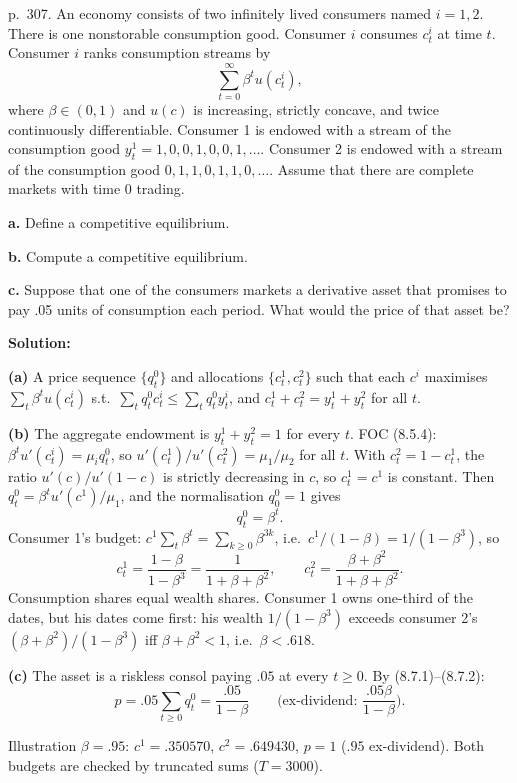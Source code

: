 \documentclass[12pt, letterpaper]{article}
\begin{document}
\begin{tcolorbox}[oddbox,title={Exercise 8.5 \quad Periodic endowments}]
\begin{tcolorbox}[questionbox]
p.~307. An economy consists of two infinitely lived consumers named $i=1,2$. There is one nonstorable
consumption good. Consumer $i$ consumes $c^i_t$ at time $t$. Consumer $i$ ranks consumption streams by
\[
\sum_{t=0}^\infty\beta^tu(c^i_t),
\]
where $\beta\in(0,1)$ and $u(c)$ is increasing, strictly concave, and twice continuously differentiable.
Consumer 1 is endowed with a stream of the consumption good $y^1_t=1,0,0,1,0,0,1,\dots$. Consumer 2 is
endowed with a stream of the consumption good $0,1,1,0,1,1,0,\dots$. Assume that there are complete
markets with time 0 trading.

\textbf{a.} Define a competitive equilibrium.

\textbf{b.} Compute a competitive equilibrium.

\textbf{c.} Suppose that one of the consumers markets a derivative asset that promises to pay .05 units of
consumption each period. What would the price of that asset be?
\end{tcolorbox}

\textbf{Solution:}

\textbf{(a)} A price sequence $\{q^0_t\}$ and allocations $\{c^1_t,c^2_t\}$ such that each $c^i$ maximises
$\sum_t\beta^tu(c^i_t)$ s.t.\ $\sum_tq^0_tc^i_t\le\sum_tq^0_ty^i_t$, and $c^1_t+c^2_t=y^1_t+y^2_t$ for all $t$.

\textbf{(b)} The aggregate endowment is $y^1_t+y^2_t=1$ for every $t$. FOC (8.5.4): $\beta^tu'(c^i_t)=\mu_iq^0_t$, so
$u'(c^1_t)/u'(c^2_t)=\mu_1/\mu_2$ for all $t$. With $c^2_t=1-c^1_t$, the ratio $u'(c)/u'(1-c)$ is strictly
decreasing in $c$, so $c^1_t=c^1$ is constant. Then $q^0_t=\beta^tu'(c^1)/\mu_1$, and the normalisation
$q^0_0=1$ gives
\[
q^0_t=\beta^t.
\]
Consumer 1's budget: $c^1\sum_t\beta^t=\sum_{k\ge0}\beta^{3k}$, i.e.\ $c^1/(1-\beta)=1/(1-\beta^3)$, so
\[
\boxed{c^1_t=\frac{1-\beta}{1-\beta^3}=\frac{1}{1+\beta+\beta^2},\qquad c^2_t=\frac{\beta+\beta^2}{1+\beta+\beta^2}.}
\]
Consumption shares equal wealth shares. Consumer 1 owns one-third of the dates, but his dates come first:
his wealth $1/(1-\beta^3)$ exceeds consumer 2's $(\beta+\beta^2)/(1-\beta^3)$ iff $\beta+\beta^2<1$, i.e.\
$\beta<.618$.

\textbf{(c)} The asset is a riskless consol paying $.05$ at every $t\ge0$. By (8.7.1)--(8.7.2):
\[
p=.05\sum_{t\ge0}q^0_t=\frac{.05}{1-\beta}\qquad\Big(\text{ex-dividend: }\frac{.05\beta}{1-\beta}\Big).
\]

\begin{tcolorbox}[databox]
Illustration $\beta=.95$: $c^1=.350570$, $c^2=.649430$, $p=1$ ($.95$ ex-dividend). Both budgets are checked by
truncated sums ($T=3000$).
\end{tcolorbox}
\end{tcolorbox}
\end{document}
